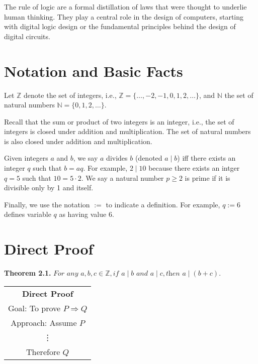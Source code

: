 \documentclass[12pt,a4paper]{article}
\begin{document}
The rule of logic are a formal distillation of laws that were thought to underlie human thinking. They play a central role in the design of computers, starting with digital logic design or the fundamental principles behind the design of digital circuits.

\section*{Notation and Basic Facts}

Let $\mathbb{Z}$ denote the set of integers, i.e., $\mathbb{Z}=\{\dots,-2,-1,0,1,2,\dots\}$, and $\mathbb{N}$ the set of natural numbers $\mathbb{N}=\{0,1,2,\dots\}$.

\bigbreak

Recall that the sum or product of two integers is an integer, i.e., the set of integers is closed under addition and multiplication. The set of natural numbers is also closed under addition and multiplication.

\bigbreak

Given integers $a$ and $b$, we say $a$ divides $b$ (denoted $a\mid b$) iff there exists an integer $q$ such that $b=aq$. For example, $2\mid 10$ because there exists an intger $q=5$ such that $10=5\cdot 2$. We say a natural number $p\geq 2$ is prime if it is divisible only by 1 and itself.

\bigbreak

Finally, we use the notation $:=$ to indicate a definition. For example, $q:=6$ defines variable $q$ as having value 6.

\newpage

\section*{Direct Proof}

\textbf{Theorem 2.1.} $\textit{For any } a,b,c \in \mathbb{Z}, \textit{if } a\mid b \textit{ and } a\mid c, \textit{then } a\mid (b+c)$.

\begin{center}
	\begin{tabular}{|c|}
	\hline 
	\rule[-1ex]{0pt}{2.5ex} \textbf{Direct Proof}\\ 
	\rule[-1ex]{0pt}{2.5ex} Goal: To prove $P\Rightarrow Q$ \\ 
	\rule[-1ex]{0pt}{2.5ex} Approach: Assume $P$  \\ 
	\rule[-1ex]{0pt}{2.5ex} \vdots \\ 
	\rule[-1ex]{0pt}{2.5ex} Therefore $Q$ \\ 
	\hline
\end{tabular} 
\end{center}
\end{document}
